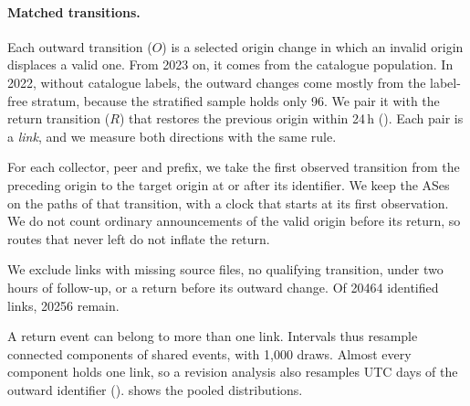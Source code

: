 \paragraph{Matched transitions.}
Each outward transition ($O$) is a selected origin change in which an invalid origin displaces a valid one.
From 2023 on, it comes from the catalogue population.
In 2022, without catalogue labels, the outward changes come mostly from the label-free stratum, because the stratified sample holds only 96.
We pair it with the return transition ($R$) that restores the previous origin within 24\,h ().
Each pair is a \emph{link}, and we measure both directions with the same rule.

For each collector, peer and prefix, we take the first observed transition from the preceding origin to the target origin at or after its identifier.
We keep the ASes on the paths of that transition, with a clock that starts at its first observation.
We do not count ordinary announcements of the valid origin before its return, so routes that never left do not inflate the return.

We exclude links with missing source files, no qualifying transition, under two hours of follow-up, or a return before its outward change.
Of \num{20464} identified links, \num{20256} remain.

A return event can belong to more than one link.
Intervals thus resample connected components of shared events, with 1,000 draws.
Almost every component holds one link, so a revision analysis also resamples UTC days of the outward identifier ().
 shows the pooled distributions.

